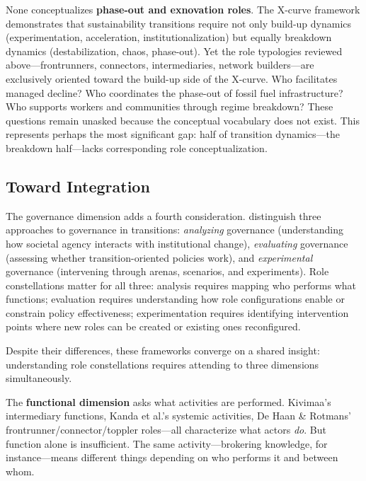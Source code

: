 \documentclass[../main.tex]{subfiles}
\begin{document}
None conceptualizes \textbf{phase-out and exnovation roles}. The X-curve framework  demonstrates that sustainability transitions require not only build-up dynamics (experimentation, acceleration, institutionalization) but equally breakdown dynamics (destabilization, chaos, phase-out). Yet the role typologies reviewed above---frontrunners, connectors, intermediaries, network builders---are exclusively oriented toward the build-up side of the X-curve. Who facilitates managed decline? Who coordinates the phase-out of fossil fuel infrastructure? Who supports workers and communities through regime breakdown? These questions remain unasked because the conceptual vocabulary does not exist. This represents perhaps the most significant gap: half of transition dynamics---the breakdown half---lacks corresponding role conceptualization.

\subsection{Toward Integration}

The governance dimension adds a fourth consideration. \textcite{loorbach2017transitions} distinguish three approaches to governance in transitions: \textit{analyzing} governance (understanding how societal agency interacts with institutional change), \textit{evaluating} governance (assessing whether transition-oriented policies work), and \textit{experimental} governance (intervening through arenas, scenarios, and experiments). Role constellations matter for all three: analysis requires mapping who performs what functions; evaluation requires understanding how role configurations enable or constrain policy effectiveness; experimentation requires identifying intervention points where new roles can be created or existing ones reconfigured.

Despite their differences, these frameworks converge on a shared insight: understanding role constellations requires attending to three dimensions simultaneously.

The \textbf{functional dimension} asks what activities are performed. Kivimaa's intermediary functions, Kanda et al.'s systemic activities, De Haan \& Rotmans' frontrunner/connector/toppler roles---all characterize what actors \emph{do}. But function alone is insufficient. The same activity---brokering knowledge, for instance---means different things depending on who performs it and between whom.
\end{document}
